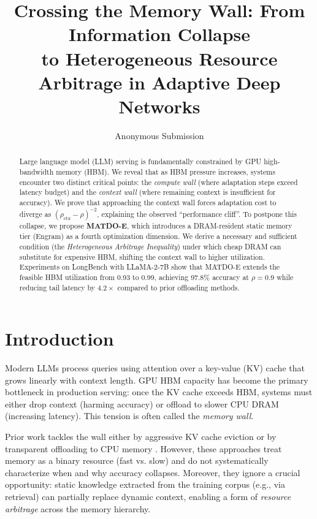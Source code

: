 \documentclass[11pt,a4paper]{article}
\title{Crossing the Memory Wall: From Information Collapse\\ to Heterogeneous Resource Arbitrage in Adaptive Deep Networks}
\author{Anonymous Submission}
\date{}
\theoremstyle{plain}
\theoremstyle{definition}
\begin{document}
\maketitle

\begin{abstract}
Large language model (LLM) serving is fundamentally constrained by GPU high-bandwidth memory (HBM). We reveal that as HBM pressure increases, systems encounter two distinct critical points: the \textit{compute wall} (where adaptation steps exceed latency budget) and the \textit{context wall} (where remaining context is insufficient for accuracy). We prove that approaching the context wall forces adaptation cost to diverge as $(\rho_{\text{ctx}}-\rho)^{-2}$, explaining the observed ``performance cliff''. To postpone this collapse, we propose \textbf{MATDO-E}, which introduces a DRAM-resident static memory tier (Engram) as a fourth optimization dimension. We derive a necessary and sufficient condition (the \textit{Heterogeneous Arbitrage Inequality}) under which cheap DRAM can substitute for expensive HBM, shifting the context wall to higher utilization. Experiments on LongBench with LLaMA-2-7B show that MATDO-E extends the feasible HBM utilization from 0.93 to 0.99, achieving 97.8\% accuracy at $\rho=0.9$ while reducing tail latency by $4.2\times$ compared to prior offloading methods.
\end{abstract}

\section{Introduction}
Modern LLMs process queries using attention over a key-value (KV) cache that grows linearly with context length. GPU HBM capacity has become the primary bottleneck in production serving: once the KV cache exceeds HBM, systems must either drop context (harming accuracy) or offload to slower CPU DRAM (increasing latency). This tension is often called the \textit{memory wall}.

Prior work tackles the wall either by aggressive KV cache eviction \cite{snapkv,h2o,streamingllm} or by transparent offloading to CPU memory \cite{flexgen}. However, these approaches treat memory as a binary resource (fast vs. slow) and do not systematically characterize when and why accuracy collapses. Moreover, they ignore a crucial opportunity: static knowledge extracted from the training corpus (e.g., via retrieval) can partially replace dynamic context, enabling a form of \textit{resource arbitrage} across the memory hierarchy.
\end{document}
